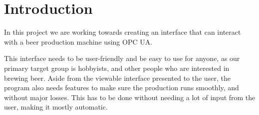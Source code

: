 \section{Introduction}

In this project we are working towards creating an interface that can interact with a beer production machine using OPC UA. \newline

This interface needs to be user-friendly and be easy to use for anyone, as our primary target group is hobbyists, and other people who are interested in brewing beer. \newline
Aside from the viewable interface presented to the user, the program also needs features to make sure the production runs smoothly, and without major losses. \newline
This has to be done without needing a lot of input from the user, making it mostly automatic. \newline
